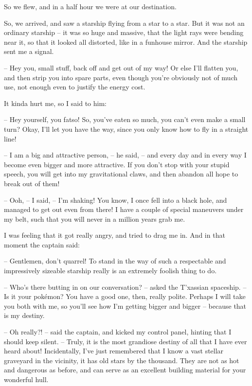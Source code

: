 \documentclass[ebook,oneside,final,openright]{memoir}
\begin{document}
So we flew, and in a half hour we were at our destination.\par
\par
So, we arrived, and saw a starship flying from a star to a star. But it was not an ordinary starship – it was so huge and massive, that the light rays were bending near it, so that it looked all distorted, like in a funhouse mirror. And the starship sent me a signal.\par
– Hey you, small stuff, back off and get out of my way! Or else I’ll flatten you, and then strip you into spare parts, even though you’re obviously not of much use, not enough even to justify the energy cost.\par
It kinda hurt me, so I said to him:\par
– Hey yourself, you fatso! So, you’ve eaten so much, you can’t even make a small turn? Okay, I’ll let you have the way, since you only know how to fly in a straight line!\par
– I am a big and attractive person, – he said, – and every day and in every way I become even bigger and more attractive. If you don’t stop with your stupid speech, you will get into my gravitational claws, and then abandon all hope to break out of them!\par
– Ooh, – I said, – I’m shaking! You know, I once fell into a black hole, and managed to get out even from there! I have a couple of special maneuvers under my belt, such that you will never in a million years grab me.\par
\par
I was feeling that it got really angry, and tried to drag me in. And in that moment the captain said:\par
– Gentlemen, don’t quarrel! To stand in the way of such a respectable and impressively sizeable starship really is an extremely foolish thing to do.\par
– Who’s there butting in on our conversation? – asked the T’xassian spaceship. – Is it your pokémon? You have a good one, then, really polite. Perhaps I will take you both with me, so you’ll see how I’m getting bigger and bigger – because that is my destiny.\par
– Oh really?! – said the captain, and kicked my control panel, hinting that I should keep silent. – Truly, it is the most grandiose destiny of all that I have ever heard about! Incidentally, I’ve just remembered that I know a vast stellar graveyard in the vicinity, it has old stars by the thousand. They are not as hot and dangerous as before, and can serve as an excellent building material for your wonderful hull.\par
\end{document}
